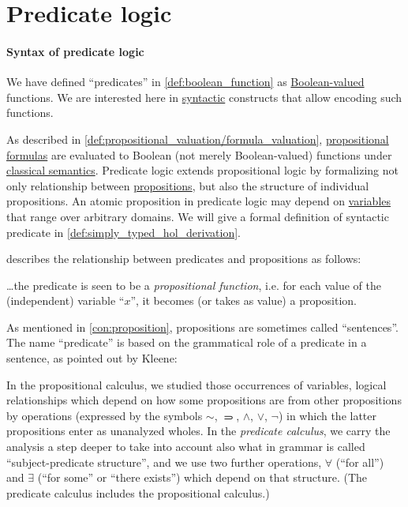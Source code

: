 \section{Predicate logic}\label{sec:predicate_logic}

\paragraph{Syntax of predicate logic}

\begin{remark}\label{rem:predicate_logic}
  We have defined \enquote{predicates} in \cref{def:boolean_function} as \hyperref[con:boolean_value]{Boolean-valued} functions. We are interested here in \hyperref[con:syntax_semantics_duality]{syntactic} constructs that allow encoding such functions.

  As described in \cref{def:propositional_valuation/formula_valuation}, \hyperref[def:propositional_syntax/formula]{propositional formulas} are evaluated to Boolean (not merely Boolean-valued) functions under \hyperref[def:first_order_semantics]{classical semantics}. Predicate logic extends propositional logic by formalizing not only relationship between \hyperref[con:proposition]{propositions}, but also the structure of individual propositions. An atomic proposition in predicate logic may depend on \hyperref[con:variable]{variables} that range over arbitrary domains. We will give a formal definition of syntactic predicate in \cref{def:simply_typed_hol_derivation}.

   describes the relationship between predicates and propositions as follows:
  \begin{displayquote}
    \ldots the predicate is seen to be a \textit{propositional function}, i.e. for each value of the (independent) variable \enquote{\( x \)}, it becomes (or takes as value) a proposition.
  \end{displayquote}

  As mentioned in \cref{con:proposition}, propositions are sometimes called \enquote{sentences}. The name \enquote{predicate} is based on the grammatical role of a predicate in a sentence, as pointed out by Kleene:
  \begin{displayquote}
    In the propositional calculus, we studied those occurrences of variables, logical relationships which depend on how some propositions are from other propositions by operations (expressed by the symbols \( \sim \), \( \rightimply \), \( \land \), \( \vee \), \( \neg \)) in which the latter
    propositions enter as unanalyzed wholes. In the \textit{predicate calculus}, we carry the analysis a step deeper to take into account also what in grammar is called \enquote{subject-predicate structure}, and we use two further operations, \( \forall \) (\enquote{for all}) and \( \exists \) (\enquote{for some} or \enquote{there exists}) which depend on that structure. (The predicate calculus includes the propositional calculus.)
  \end{displayquote}


\end{remark}
